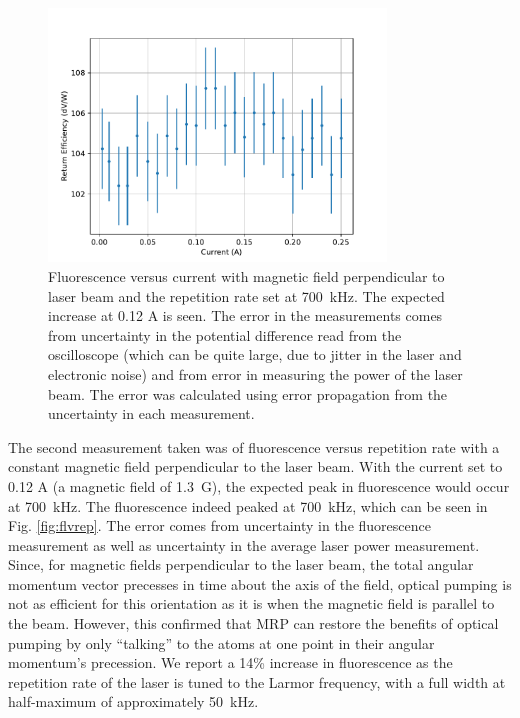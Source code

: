 \begin{figure}[htpb]
	\centering
	\includegraphics[width=0.8\textwidth]{../../MRPData/EfficiencyCurr.pdf}
	\caption{Fluorescence versus current with magnetic field perpendicular to laser beam and the repetition rate set at \SI{700}{ kHz}. The expected increase at 0.12 A is seen. The error in the measurements comes from uncertainty in the potential difference read from the oscilloscope (which can be quite large, due to jitter in the laser and electronic noise) and from error in measuring the power of the laser beam. The error was calculated using error propagation from the uncertainty in each measurement.}
	\label{fig:flvc}
\end{figure}

The second measurement taken was of fluorescence versus repetition rate with a constant magnetic field perpendicular to the laser beam. With the current set to 0.12 A (a magnetic field of \SI{1.3}{ G}), the expected peak in fluorescence would occur at \SI{700}{ kHz}. The fluorescence indeed peaked at \SI{700}{ kHz}, which can be seen in Fig. \ref{fig:flvrep}. The error comes from uncertainty in the fluorescence measurement as well as uncertainty in the average laser power measurement. Since, for magnetic fields perpendicular to the laser beam, the total angular momentum vector precesses in time about the axis of the field, optical pumping is not as efficient for this orientation as it is when the magnetic field is parallel to the beam. However, this confirmed that MRP can restore the benefits of optical pumping by only ``talking'' to the atoms at one point in their angular momentum's precession. We report a 14\% increase in fluorescence as the repetition rate of the laser is tuned to the Larmor frequency, with a full width at half-maximum of approximately \SI{50}{ kHz}.

